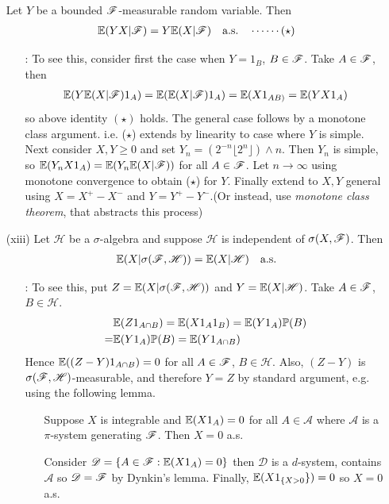 \documentclass[12pt,a4paper]{report}
\begin{document}
\begin{itemize}
Let $Y$ be a bounded $\mathscr{F}$-measurable random variable. Then 
\begin{align*}
\mathbb{E}(YX|\mathscr{F})  = Y\mathbb{E}(X|\mathscr{F}) \quad \text{a.s.} \quad \cdots\cdots (\star)
\end{align*}
\begin{itemize}
\item[:] To see this, consider first the case when $Y=1_B$, $B\in \mathscr{F}$. Take $A\in \mathscr{F}$, then
\begin{align*}
\mathbb{E}(Y\mathbb{E}(X|\mathscr{F}) 1_A) = \mathbb{E}(\mathbb{E}(X|\mathscr{F})1_A) = \mathbb{E}(X1_{AB)} = \mathbb{E}(YX1_A) 
\end{align*}
so above identity $(\star)$ holds. The general case follows by a monotone class argument. i.e. ($\star$) extends by linearity to case where $Y$ is simple. Next consider $X,Y\geq 0$ and set $Y_n = (2^{-n} \lfloor 2^n \rfloor)\wedge n$. Then $Y_n$ is simple, so $\mathbb{E}(Y_n X 1_A) = \mathbb{E}(Y_n \mathbb{E}(X|\mathscr{F}))$ for all $A\in \mathscr{F}$. Let $n\rightarrow \infty$ using monotone convergence to obtain ($\star$) for $Y$. Finally extend to $X,Y$ general using $X = X^+ - X^-$ and $Y=Y^+ - Y^-$.(Or instead, use \emph{monotone class theorem}, that abstracts this process)
\end{itemize}
\item[(xiii)] Let $\mathscr{H}$ be a $\sigma$-algebra and suppose $\mathscr{H}$ is independent of $\sigma(X,\mathscr{F})$. Then
\begin{align*}
\mathbb{E}(X|\sigma(\mathscr{F}, \mathscr{H})) = \mathbb{E}(X|\mathscr{H}) \quad \text{a.s.}
\end{align*}
\begin{itemize}
\item[:] To see this, put $Z =\mathbb{E}(X|\sigma(\mathscr{F}, \mathscr{H}))$ and $Y = \mathbb{E}(X|\mathscr{H})$. Take $A\in \mathscr{F}$, $B\in \mathscr{H}$.
\begin{align*}
&\mathbb{E}(Z 1_{A\cap B}) = \mathbb{E}(X 1_A 1_B)= \mathbb{E}(Y 1_A)\mathbb{P}(B) \\
=& \mathbb{E}(Y 1_A) \mathbb{P}(B) = \mathbb{E}(Y1_{A\cap B})
\end{align*}
Hence $\mathbb{E}((Z-Y)1_{A\cap B})= 0$ for all $A\in \mathscr{F}$, $B\in \mathscr{H}$. Also, $(Z-Y)$ is $\sigma(\mathscr{F},\mathscr{H})$-measurable, and therefore $Y=Z$ by standard argument, e.g. using the following lemma.
\begin{itemize}
\item[] \lem Suppose $X$ is integrable and $\mathbb{E}(X1_A) = 0$ for all $A\in \mathscr{A}$ where $\mathscr{A}$ is a $\pi$-system generating $\mathscr{F}$. Then $X=0$ a.s.

\pf Consider $\mathscr{D}  = \{A\in \mathscr{F} : \mathbb{E}(X1_A) =0\}$ then $\mathscr{D}$ is a $d$-system, contains $\mathscr{A}$ so $\mathscr{D} = \mathscr{F}$ by Dynkin's lemma. Finally, $\mathbb{E}(X 1_{ \{X>0}\} ) =0$ so $X=0$ a.s.
\end{itemize}
\end{itemize}
\end{itemize}
\s
\end{document}
